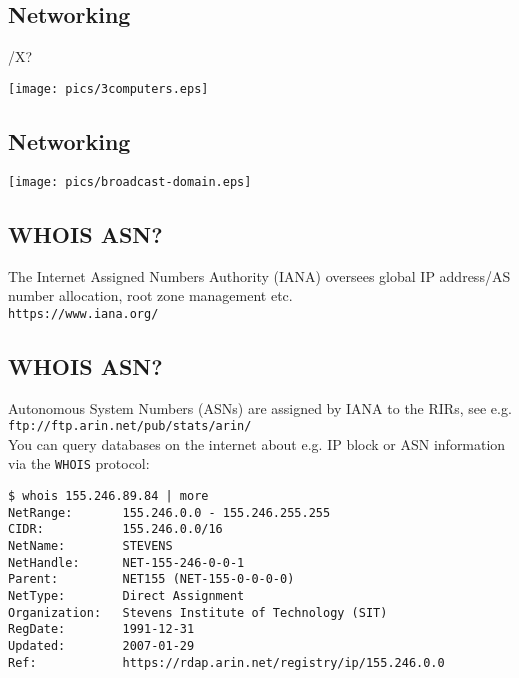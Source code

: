 \documentclass[xga]{xdvislides}
\begin{document}
\subsection{Networking}
/X? %
\vspace*{\fill}
\begin{center}
	\texttt{[image: pics/3computers.eps]} \\
\end{center}
\vspace*{\fill}

\subsection{Networking}
\vspace*{\fill}
\begin{center}
	\texttt{[image: pics/broadcast-domain.eps]} \\
\end{center}
\vspace*{\fill}

\subsection{WHOIS ASN?}
\Huge
\vfill
\begin{center}
The Internet Assigned Numbers Authority (IANA) oversees global IP
address/AS number allocation, root zone management etc.
\\
\vspace{.5in}
\verb+https://www.iana.org/+
\end{center}
\vfill
\Normalsize

\subsection{WHOIS ASN?}
Autonomous System Numbers (ASNs) are assigned by IANA
to the RIRs, see e.g. {\tt
ftp://ftp.arin.net/pub/stats/arin/}
\\

You can query databases on the internet about e.g. IP
block or ASN information via the {\tt WHOIS} protocol:

\begin{verbatim}
$ whois 155.246.89.84 | more
NetRange:       155.246.0.0 - 155.246.255.255
CIDR:           155.246.0.0/16
NetName:        STEVENS
NetHandle:      NET-155-246-0-0-1
Parent:         NET155 (NET-155-0-0-0-0)
NetType:        Direct Assignment
Organization:   Stevens Institute of Technology (SIT)
RegDate:        1991-12-31
Updated:        2007-01-29
Ref:            https://rdap.arin.net/registry/ip/155.246.0.0
\end{verbatim}
\end{document}
